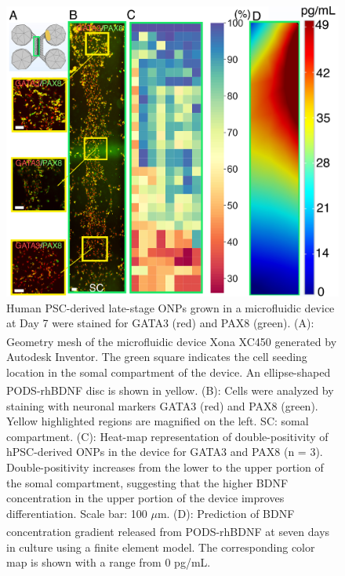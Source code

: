 \documentclass[review]{elsarticle}
\begin{document}
\begin{figure}
	\begin{center}
		\includegraphics[width=13cm]{Fig_7.jpg}
	\end{center}
	\caption{Human PSC-derived late-stage ONPs grown in a microfluidic device at Day 7 were stained for GATA3 (red) and PAX8 (green). (A): Geometry mesh of the microfluidic device Xona\textsuperscript{\texttrademark} XC450 generated by Autodesk Inventor. The green square indicates the cell seeding location in the somal compartment of the device. An ellipse-shaped PODS\textsuperscript{\textregistered}-rhBDNF disc is shown in yellow. (B): Cells were analyzed by staining with neuronal markers GATA3 (red) and PAX8 (green). Yellow highlighted regions are magnified on the left. SC: somal compartment. (C): Heat-map representation of double-positivity of hPSC-derived ONPs in the device for GATA3 and PAX8 (n = 3). Double-positivity increases from the lower to the upper portion of the somal compartment, suggesting that the higher BDNF concentration in the upper portion of the device improves differentiation. Scale bar: 100 $\mu$m. (D): Prediction of BDNF concentration gradient released from PODS\textsuperscript{\textregistered}-rhBDNF at seven days in culture using a finite element model.  The corresponding color map is shown with a range from 0 pg/mL.
	}
\end{figure}
\end{document}

